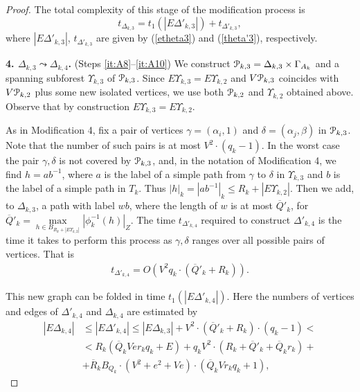 \documentclass[a4paper,12pt]{article}
\renewcommand{\a}{\alpha }
\renewcommand{\b}{\beta }
\newcommand{\G}{\Gamma }
\newcommand{\g}{\gamma }
\newcommand{\D}{\Delta }
\renewcommand{\d}{\delta }
\newcommand{\U}{\Upsilon }
\newcommand{\cP}{{\cal{P}}}
\numberwithin{equation}{section}
\numberwithin{figure}{section}
\begin{document}
\begin{proof}
The total complexity of this stage of the modification process is
\begin{equation}\label{theta3}
t_{\D_{k,3}} = t_1(|E\D'_{k,3}|)
+ t_{\D'_{k,3}},
\end{equation}
where $|E\D'_{k,3}|$, $t_{\D'_{k,3}}$ are given by (\ref{etheta3}) and
(\ref{theta'3}), respectively.


{\bf 4. $\D_{k,3} \leadsto \D_{k,4}$.} (Steps \ref{it:A8}--\ref{it:A10})
We construct $\cP_{k,3}=\D_{k,3}\times
\G_{A_k}$ and a
spanning subforest $\U_{k,3}$ of $\cP_{k,3}$. Since $E\U_{k,3} =
E\U_{k,2}$ and $V\cP_{k,3}$ coincides with $V\cP_{k,2}$ plus some new isolated
vertices, we use both $\cP_{k,2}$ and $\U_{k,2}$ obtained above. Observe that by construction $E\U_{k,3} =
E\U_{k,2}$.


As in Modification 4, fix a pair of vertices $\g=(\a_i,1)$ and
$\d=(\a_j,\b)$ in $\cP_{k,3}$. Note that the number of such pairs is
at most $V^2 \cdot (q_k-1)$. In the worst case the pair $\g, \d$ is
not covered by $\cP_{k,3}$, and, in the notation of Modification 4, we
find $h=ab^{-1}$, where $a$ is the label of a simple path from
$\g$ to $\d$ in $\U_{k,3}$ and $b$ is the label of a simple path in
$T_k$. Thus $|h|_k = |ab^{-1}|_k \le R_k+ | E\U_{k,2}|$.  Then we add,
to $\D_{k,3}$, a path with label $wb$, where the length of $w$ is
 at most $\overline{Q}'_k$, for
$\overline{Q}'_k=\max\limits_{h \in B_{R_k+|
E\U_{k,2}|}}|\phi^{-1}_k(h)|_Z$.
The time $t_{\D'_{k,4}}$ required to construct $\D'_{k,4}$ is the time
it takes to perform this process as $\g,\d$ ranges over all
possible pairs of vertices. That is
\begin{equation}\label{theta'4}
\begin{split}
t_{\D'_{k,4}} =
 O(V^2 q_k \cdot(\overline{Q}'_k+R_k)).
\end{split}
\end{equation}

This new graph can be folded in time $t_1(|E\D'_{k,4}|)$. Here the
numbers of vertices and edges of $\D'_{k,4}$ and $\D_{k,4}$ are estimated
by
\begin{equation}\label{etheta4}
\begin{split}
|E\D_{k,4}| &\le |E\D'_{k,4}| \le |E\D_{k,3}|+ V^2 \cdot (\overline{Q}'_k +
R_k)\cdot(q_k-1)<\\
&< R_k(\overline{Q}_k V e r_k q_k + E) + q_k V^2\cdot (R_k + \overline{Q}'_k + \overline{Q}_k r_k) +\\
&+ \overline{R}_k B_{Q_k} \cdot(V^2+ e^2 + Ve)\cdot(\overline{Q}_k
V r_k q_k +1),
\end{split}
\end{equation}


\end{proof}
\end{document}
